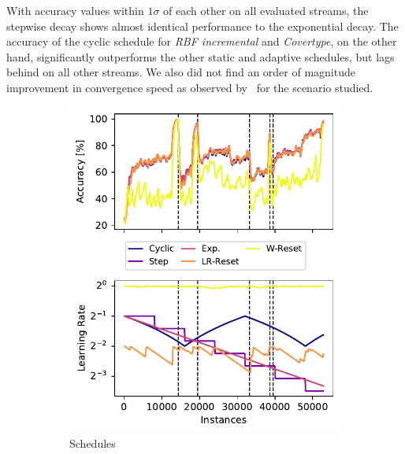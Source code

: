 \documentclass[runningheads]{llncs}
\begin{document}
With accuracy values within $1\sigma$ of each other on all evaluated streams, the stepwise decay shows almost identical performance to the exponential decay.
The accuracy of the cyclic schedule for \textit{RBF incremental} and \textit{Covertype}, on the other hand, significantly outperforms the other static and adaptive schedules, but lags behind on all other streams.
We also did not find an order of magnitude improvement in convergence speed as observed by~\cite{smithSuperConvergenceVeryFast2018a} for the scenario studied.

\begin{figure}[ht]
	\centering
	\begin{subfigure}[b]{0.496\textwidth}
		\includegraphics[width=\textwidth]{figures/lr_norms_schedules_insects_abrupt.pdf}
		\caption{Schedules}
		\label{fig:prequential_schedulers_insects}
	\end{subfigure}
	\begin{subfigure}[b]{0.496\textwidth}

\end{subfigure}
\end{figure}
\end{document}

